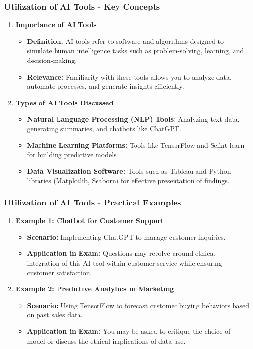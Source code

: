 \documentclass[aspectratio=169]{beamer}
\begin{document}
\begin{frame}[fragile]
    \frametitle{Utilization of AI Tools - Key Concepts}
    \begin{enumerate}
        \item \textbf{Importance of AI Tools}
        \begin{itemize}
            \item \textbf{Definition:} AI tools refer to software and algorithms designed to simulate human intelligence tasks such as problem-solving, learning, and decision-making.
            \item \textbf{Relevance:} Familiarity with these tools allows you to analyze data, automate processes, and generate insights efficiently.
        \end{itemize}
        
        \item \textbf{Types of AI Tools Discussed}
        \begin{itemize}
            \item \textbf{Natural Language Processing (NLP) Tools:} Analyzing text data, generating summaries, and chatbots like ChatGPT.
            \item \textbf{Machine Learning Platforms:} Tools like TensorFlow and Scikit-learn for building predictive models.
            \item \textbf{Data Visualization Software:} Tools such as Tableau and Python libraries (Matplotlib, Seaborn) for effective presentation of findings.
        \end{itemize}
    \end{enumerate}
\end{frame}

\begin{frame}[fragile]
    \frametitle{Utilization of AI Tools - Practical Examples}
    \begin{enumerate}
        \item \textbf{Example 1: Chatbot for Customer Support}
        \begin{itemize}
            \item \textbf{Scenario:} Implementing ChatGPT to manage customer inquiries.
            \item \textbf{Application in Exam:} Questions may revolve around ethical integration of this AI tool within customer service while ensuring customer satisfaction.
        \end{itemize}
        
        \item \textbf{Example 2: Predictive Analytics in Marketing}
        \begin{itemize}
            \item \textbf{Scenario:} Using TensorFlow to forecast customer buying behaviors based on past sales data.
            \item \textbf{Application in Exam:} You may be asked to critique the choice of model or discuss the ethical implications of data use.
        \end{itemize}
    \end{enumerate}
\end{frame}
\end{document}
